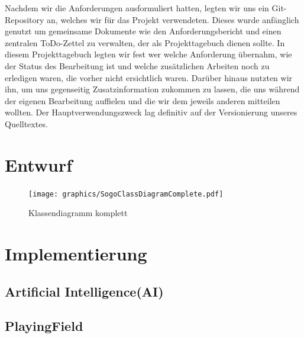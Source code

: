 \documentclass[a4paper]{scrartcl}
\begin{document}
Nachdem wir die Anforderungen ausformuliert hatten, legten wir uns ein Git-Repository an, welches wir für das Projekt verwendeten. Dieses wurde anfänglich genutzt um gemeinsame Dokumente wie den Anforderungsbericht und einen zentralen ToDo-Zettel zu verwalten, der als Projekttagebuch dienen sollte. In diesem Projekttagebuch legten wir fest wer welche Anforderung übernahm, wie der Status des Bearbeitung ist und welche zusätzlichen Arbeiten noch zu erledigen waren, die vorher nicht ersichtlich waren. Darüber hinaus nutzten wir ihn, um uns gegenseitig Zusatzinformation zukommen zu lassen, die uns während der eigenen Bearbeitung auffielen und die wir dem jeweils anderen mitteilen wollten. Der Hauptverwendungszweck lag definitiv auf der Versionierung unseres Quelltextes.

\section{Entwurf}\label{ch:Entwurf}

\begin{figure}[H]
 \centering
 \texttt{[image: graphics/SogoClassDiagramComplete.pdf]}
 \caption{Klassendiagramm komplett}
 \label{fig:ClassdiagramComplete}
\end{figure}

\section{Implementierung}\label{ch:Implementierung}


\subsection{Artificial Intelligence(AI)}\label{ch:AI}

\subsection{PlayingField}\label{ch:PlayingField}
\end{document}
